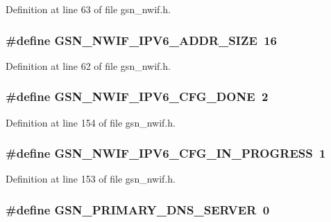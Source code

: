 Definition at line 63 of file gsn\_\-nwif.h.

\hypertarget{a00534_a59c19de5640e80b7ad4bbacc4b15ade1}{
\subsubsection[{GSN\_\-NWIF\_\-IPV6\_\-ADDR\_\-SIZE}]{\setlength{\rightskip}{0pt plus 5cm}\#define GSN\_\-NWIF\_\-IPV6\_\-ADDR\_\-SIZE~16}}
\label{a00534_a59c19de5640e80b7ad4bbacc4b15ade1}


Definition at line 62 of file gsn\_\-nwif.h.

\hypertarget{a00534_ad9ffe591a47d210792ccadcdabdf14d1}{
\subsubsection[{GSN\_\-NWIF\_\-IPV6\_\-CFG\_\-DONE}]{\setlength{\rightskip}{0pt plus 5cm}\#define GSN\_\-NWIF\_\-IPV6\_\-CFG\_\-DONE~2}}
\label{a00534_ad9ffe591a47d210792ccadcdabdf14d1}


Definition at line 154 of file gsn\_\-nwif.h.

\hypertarget{a00534_a880d7fa81ce0646c0643b532796ef39f}{
\subsubsection[{GSN\_\-NWIF\_\-IPV6\_\-CFG\_\-IN\_\-PROGRESS}]{\setlength{\rightskip}{0pt plus 5cm}\#define GSN\_\-NWIF\_\-IPV6\_\-CFG\_\-IN\_\-PROGRESS~1}}
\label{a00534_a880d7fa81ce0646c0643b532796ef39f}


Definition at line 153 of file gsn\_\-nwif.h.

\hypertarget{a00534_a62b7215b2b6aafb8cba4f699ff6e1369}{
\subsubsection[{GSN\_\-PRIMARY\_\-DNS\_\-SERVER}]{\setlength{\rightskip}{0pt plus 5cm}\#define GSN\_\-PRIMARY\_\-DNS\_\-SERVER~0}}
\label{a00534_a62b7215b2b6aafb8cba4f699ff6e1369}


